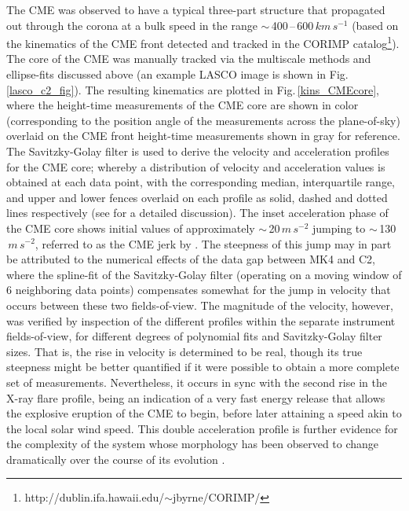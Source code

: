 \documentclass[namedreferences]{solarphysics}
\begin{document}
\begin{article}
The CME was observed to have a typical three-part structure that propagated out through the corona at a bulk speed in the range $\sim$\,400\,--\,600$\,km\,s^{-1}$ (based on the kinematics of the CME front detected and tracked in the CORIMP catalog\footnote{http://dublin.ifa.hawaii.edu/$\sim$jbyrne/CORIMP/}). The core of the CME was manually tracked via the multiscale methods and ellipse-fits discussed above (an example LASCO image is shown in Fig.\,\ref{lasco_c2_fig}). The resulting kinematics are plotted in Fig.\,\ref{kins_CMEcore}, where the height-time measurements of the CME core are shown in color (corresponding to the position angle of the measurements across the plane-of-sky) overlaid on the CME front height-time measurements shown in gray for reference. The Savitzky-Golay filter is used to derive the velocity and acceleration profiles for the CME core; whereby a distribution of velocity and acceleration values is obtained at each data point, with the corresponding median, interquartile range, and upper and lower fences overlaid on each profile as solid, dashed and dotted lines respectively (see  for a detailed discussion). The inset acceleration phase of the CME core shows initial values of approximately $\sim$\,20$\,m\,s^{-2}$ jumping to $\sim$\,130$\,m\,s^{-2}$, referred to as the CME jerk by . The steepness of this jump may in part be attributed to the numerical effects of the data gap between MK4 and C2, where the spline-fit of the Savitzky-Golay filter (operating on a moving window of 6 neighboring data points) compensates somewhat for the jump in velocity that occurs between these two fields-of-view. The magnitude of the velocity, however, was verified by inspection of the different profiles within the separate instrument fields-of-view, for different degrees of polynomial fits and Savitzky-Golay filter sizes. That is, the rise in velocity is determined to be real, though its true steepness might be better quantified if it were possible to obtain a more complete set of measurements. Nevertheless, it occurs in sync with the second rise in the X-ray flare profile, being an indication of a very fast energy release that allows the explosive eruption of the CME to begin, before later attaining a speed akin to the local solar wind speed. This double acceleration profile is further evidence for the complexity of the system whose morphology has been observed to change dramatically over the course of its evolution \cite{2013ApJS..206...19M, 2012ApJ...746L...5S}.


\end{article}
\end{document}

